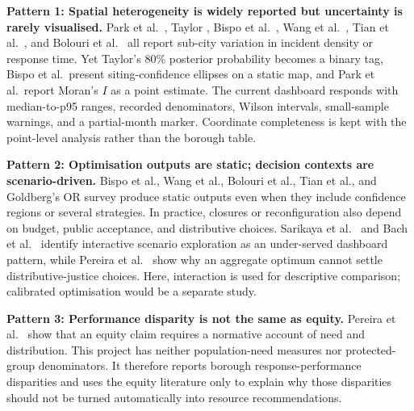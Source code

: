 \textbf{Pattern 1: Spatial heterogeneity is widely reported but uncertainty is rarely visualised.} Park et al.\ \cite{seoul2024}, Taylor \cite{spatial2015}, Bispo et al.\ \cite{reconfig2023}, Wang et al.\ \cite{beijing2021}, Tian et al.\ \cite{spacesyntax2023}, and Bolouri et al.\ \cite{ocmola2018} all report sub-city variation in incident density or response time. Yet Taylor's 80\% posterior probability becomes a binary tag, Bispo et al.\ present siting-confidence ellipses on a static map, and Park et al.\ report Moran's $I$ as a point estimate. The current dashboard responds with median-to-p95 ranges, recorded denominators, Wilson intervals, small-sample warnings, and a partial-month marker. Coordinate completeness is kept with the point-level analysis rather than the borough table.

\textbf{Pattern 2: Optimisation outputs are static; decision contexts are scenario-driven.} Bispo et al., Wang et al., Bolouri et al., Tian et al., and Goldberg's OR survey \cite{goldberg2004} produce static outputs even when they include confidence regions or several strategies. In practice, closures or reconfiguration also depend on budget, public acceptance, and distributive choices. Sarikaya et al.\ \cite{sarikaya2018} and Bach et al.\ \cite{bach2023patterns} identify interactive scenario exploration as an under-served dashboard pattern, while Pereira et al.\ \cite{pereira2017equity} show why an aggregate optimum cannot settle distributive-justice choices. Here, interaction is used for descriptive comparison; calibrated optimisation would be a separate study.

\textbf{Pattern 3: Performance disparity is not the same as equity.} Pereira et al.~\cite{pereira2017equity} show that an equity claim requires a normative account of need and distribution. This project has neither population-need measures nor protected-group denominators. It therefore reports borough response-performance disparities and uses the equity literature only to explain why those disparities should not be turned automatically into resource recommendations.

